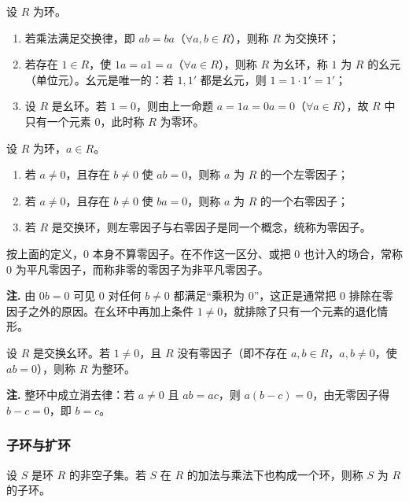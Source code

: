 \begin{definition}[交换环、幺环、零环]
设 \(R\) 为环。
\begin{enumerate}[label=(\arabic*)]
  \item 若乘法满足交换律，即 \(ab=ba\)（\(\forall a,b\in R\)），则称 \(R\) 为交换环；
  \item 若存在 \(1\in R\)，使 \(1a=a1=a\)（\(\forall a\in R\)），则称 \(R\) 为幺环，称 \(1\) 为 \(R\) 的幺元（单位元）。幺元是唯一的：若 \(1,1'\) 都是幺元，则 \(1=1\cdot1'=1'\)；
  \item 设 \(R\) 是幺环。若 \(1=0\)，则由上一命题 \(a=1a=0a=0\)（\(\forall a\in R\)），故 \(R\) 中只有一个元素 \(0\)，此时称 \(R\) 为零环。
\end{enumerate}
\end{definition}

\begin{definition}[零因子]
设 \(R\) 为环，\(a\in R\)。
\begin{enumerate}[label=(\arabic*)]
  \item 若 \(a\ne0\)，且存在 \(b\ne0\) 使 \(ab=0\)，则称 \(a\) 为 \(R\) 的一个左零因子；
  \item 若 \(a\ne0\)，且存在 \(b\ne0\) 使 \(ba=0\)，则称 \(a\) 为 \(R\) 的一个右零因子；
  \item 若 \(R\) 是交换环，则左零因子与右零因子是同一个概念，统称为零因子。
\end{enumerate}
按上面的定义，\(0\) 本身不算零因子。在不作这一区分、或把 \(0\) 也计入的场合，常称 \(0\) 为平凡零因子，而称非零的零因子为非平凡零因子。
\end{definition}

\noindent\textbf{注.} 由 \(0b=0\) 可见 \(0\) 对任何 \(b\ne0\) 都满足“乘积为 \(0\)”，这正是通常把 \(0\) 排除在零因子之外的原因。在幺环中再加上条件 \(1\ne0\)，就排除了只有一个元素的退化情形。

\begin{definition}[整环]
设 \(R\) 是交换幺环。若 \(1\ne0\)，且 \(R\) 没有零因子（即不存在 \(a,b\in R\)，\(a,b\ne0\)，使 \(ab=0\)），则称 \(R\) 为整环。
\end{definition}

\noindent\textbf{注.} 整环中成立消去律：若 \(a\ne0\) 且 \(ab=ac\)，则 \(a(b-c)=0\)，由无零因子得 \(b-c=0\)，即 \(b=c\)。

\subsubsection{子环与扩环}

\begin{definition}[子环]
设 \(S\) 是环 \(R\) 的非空子集。若 \(S\) 在 \(R\) 的加法与乘法下也构成一个环，则称 \(S\) 为 \(R\) 的子环。
\end{definition}

